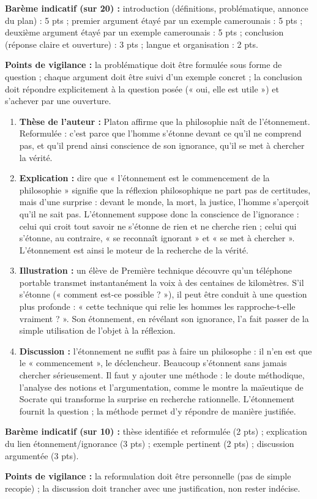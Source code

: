 \documentclass[11pt]{article}
\begin{document}
\begin{corrige}
\textbf{Barème indicatif (sur 20) :} introduction (définitions, problématique, annonce du plan) : 5 pts ; premier argument étayé par un exemple camerounais : 5 pts ; deuxième argument étayé par un exemple camerounais : 5 pts ; conclusion (réponse claire et ouverture) : 3 pts ; langue et organisation : 2 pts.

\textbf{Points de vigilance :} la problématique doit être formulée sous forme de question ; chaque argument doit être suivi d'un exemple concret ; la conclusion doit répondre explicitement à la question posée (« oui, elle est utile ») et s'achever par une ouverture.
\end{corrige}

\begin{corrige}
\begin{enumerate}
\item \textbf{Thèse de l'auteur :} Platon affirme que la philosophie naît de l'étonnement. Reformulée : c'est parce que l'homme s'étonne devant ce qu'il ne comprend pas, et qu'il prend ainsi conscience de son ignorance, qu'il se met à chercher la vérité.
\item \textbf{Explication :} dire que « l'étonnement est le commencement de la philosophie » signifie que la réflexion philosophique ne part pas de certitudes, mais d'une surprise : devant le monde, la mort, la justice, l'homme s'aperçoit qu'il ne sait pas. L'étonnement suppose donc la conscience de l'ignorance : celui qui croit tout savoir ne s'étonne de rien et ne cherche rien ; celui qui s'étonne, au contraire, « se reconnaît ignorant » et « se met à chercher ». L'étonnement est ainsi le moteur de la recherche de la vérité.
\item \textbf{Illustration :} un élève de Première technique découvre qu'un téléphone portable transmet instantanément la voix à des centaines de kilomètres. S'il s'étonne (« comment est-ce possible ? »), il peut être conduit à une question plus profonde : « cette technique qui relie les hommes les rapproche-t-elle vraiment ? ». Son étonnement, en révélant son ignorance, l'a fait passer de la simple utilisation de l'objet à la réflexion.
\item \textbf{Discussion :} l'étonnement ne suffit pas à faire un philosophe : il n'en est que le « commencement », le déclencheur. Beaucoup s'étonnent sans jamais chercher sérieusement. Il faut y ajouter une méthode : le doute méthodique, l'analyse des notions et l'argumentation, comme le montre la maïeutique de Socrate qui transforme la surprise en recherche rationnelle. L'étonnement fournit la question ; la méthode permet d'y répondre de manière justifiée.
\end{enumerate}
\textbf{Barème indicatif (sur 10) :} thèse identifiée et reformulée (2 pts) ; explication du lien étonnement/ignorance (3 pts) ; exemple pertinent (2 pts) ; discussion argumentée (3 pts).

\textbf{Points de vigilance :} la reformulation doit être personnelle (pas de simple recopie) ; la discussion doit trancher avec une justification, non rester indécise.
\end{corrige}
\end{document}

